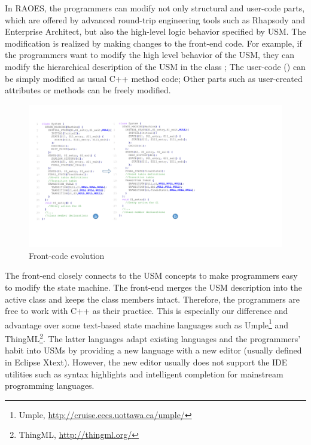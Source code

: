 In RAOES, the programmers can modify not only structural and user-code parts, which are offered by advanced round-trip engineering tools such as Rhapsody and Enterprise Architect, but also the high-level logic behavior specified by USM.
The modification is realized by making changes to the front-end code.
For example, if the programmers want to modify the high level behavior of the USM, they can modify the hierarchical description of the USM in the class ;
The user-code () can be simply modified as usual C++ method code;
Other parts such as user-created attributes or methods can be freely modified.




\begin{figure}
	\centering
	\includegraphics[clip, trim=1.10cm 3.6cm 10.9cm 1.9cm, width=1.08\columnwidth]{figures/frontendoverview.pdf}
	\caption{Front-code evolution} 
	\label{fig:frontend-overview}
\end{figure}



The front-end closely connects to the USM concepts to make programmers easy to modify the state machine.
The front-end merges the USM description into the active class  and keeps the class members intact. 
Therefore, the programmers are free to work with C++ as their practice.
This is especially our difference and advantage over some text-based state machine languages such as Umple\footnote{Umple, \url{http://cruise.eecs.uottawa.ca/umple/}} and ThingML\footnote{ThingML, \url{http://thingml.org/}}.
The latter languages adapt existing languages and the programmers' habit into USMs by providing a new language with a new editor (usually defined in Eclipse Xtext).
However, the new editor usually does not support the IDE utilities such as syntax highlights and intelligent completion for mainstream programming languages. 



